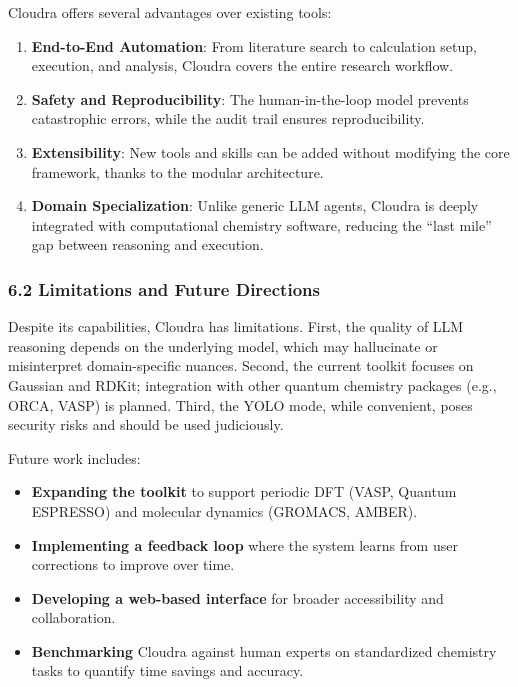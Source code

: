 Cloudra offers several advantages over existing tools:

\begin{enumerate}
\def\labelenumi{\arabic{enumi}.}
\tightlist
\item
  \textbf{End-to-End Automation}: From literature search to calculation
  setup, execution, and analysis, Cloudra covers the entire research
  workflow.
\item
  \textbf{Safety and Reproducibility}: The human-in-the-loop model
  prevents catastrophic errors, while the audit trail ensures
  reproducibility.
\item
  \textbf{Extensibility}: New tools and skills can be added without
  modifying the core framework, thanks to the modular architecture.
\item
  \textbf{Domain Specialization}: Unlike generic LLM agents, Cloudra is
  deeply integrated with computational chemistry software, reducing the
  ``last mile'' gap between reasoning and execution.
\end{enumerate}

\hypertarget{limitations-and-future-directions}{%
\subsubsection{6.2 Limitations and Future
Directions}\label{limitations-and-future-directions}}

Despite its capabilities, Cloudra has limitations. First, the quality of
LLM reasoning depends on the underlying model, which may hallucinate or
misinterpret domain-specific nuances. Second, the current toolkit
focuses on Gaussian and RDKit; integration with other quantum chemistry
packages (e.g., ORCA, VASP) is planned. Third, the YOLO mode, while
convenient, poses security risks and should be used judiciously.

Future work includes:

\begin{itemize}
\tightlist
\item
  \textbf{Expanding the toolkit} to support periodic DFT (VASP, Quantum
  ESPRESSO) and molecular dynamics (GROMACS, AMBER).
\item
  \textbf{Implementing a feedback loop} where the system learns from
  user corrections to improve over time.
\item
  \textbf{Developing a web-based interface} for broader accessibility
  and collaboration.
\item
  \textbf{Benchmarking} Cloudra against human experts on standardized
  chemistry tasks to quantify time savings and accuracy.
\end{itemize}

